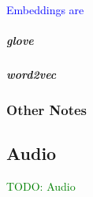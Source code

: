 

\textcolor{blue}{Embeddings are }

\subparagraph{glove}


\subparagraph{word2vec}


\subsubsection{Other Notes}


\subsection{Audio}


\textcolor{green}{TODO: Audio}
